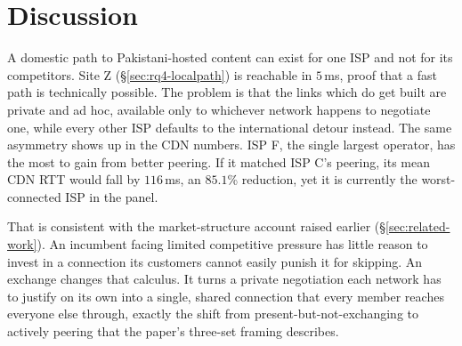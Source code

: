 \documentclass[sigconf,anonymous,10pt]{acmart}
\begin{document}

\section{Discussion}
\label{sec:discussion}
A domestic path to Pakistani-hosted content can exist for one ISP and not for its competitors. Site Z (\S\ref{sec:rq4-localpath}) is reachable in $5$\,ms, proof that a fast path is technically possible. The problem is that the links which do get built are private and ad hoc, available only to whichever network happens to negotiate one, while every other ISP defaults to the international detour instead. The same asymmetry shows up in the CDN numbers. ISP F, the single largest operator, has the most to gain from better peering. If it matched ISP C's peering, its mean CDN RTT would fall by $116$\,ms, an $85.1$\% reduction, yet it is currently the worst-connected ISP in the panel.

That is consistent with the market-structure account raised earlier (\S\ref{sec:related-work}). An incumbent facing limited competitive pressure has little reason to invest in a connection its customers cannot easily punish it for skipping. An exchange changes that calculus. It turns a private negotiation each network has to justify on its own into a single, shared connection that every member reaches everyone else through, exactly the shift from present-but-not-exchanging to actively peering that the paper's three-set framing describes.


\end{document}
